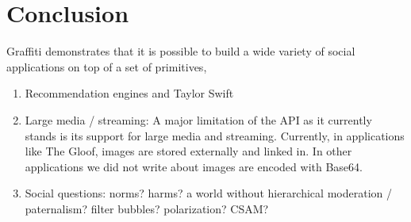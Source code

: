 \section{Conclusion}

Graffiti demonstrates
that it is possible to build a wide variety
of social applications on top of a set of primitives,

\begin{enumerate}
    \item
    Recommendation engines and Taylor Swift
    \item
    Large media / streaming: 
A major limitation of the API as it currently stands
is its support for large media and streaming.
Currently, in applications like The Gloof, images
are stored externally and linked in. In other applications
we did not write about images are encoded with Base64.
\item 
Social questions: norms? harms? a world without hierarchical moderation / paternalism? filter bubbles? polarization? CSAM?
\end{enumerate}

